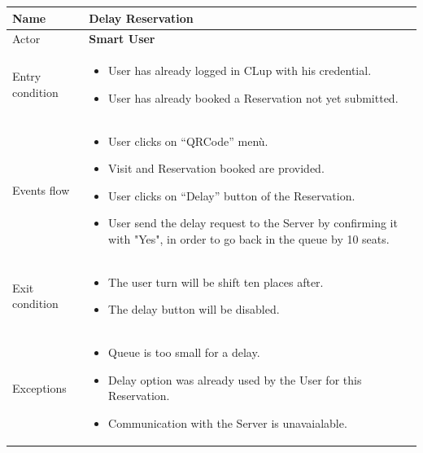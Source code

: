 \begin{tabular}{|p{5cm} | p{7cm} | }
	\hline
	Name & \textbf{Delay Reservation} \\
	\hline
	Actor & \textbf{Smart User}\\
	\hline
	Entry condition &
	\begin{itemize}
		\item User has already logged in CLup with his credential. 
		\item User has already booked a Reservation not yet submitted.
	\end{itemize} \\
	\hline
	Events flow & 
	\begin{itemize}
		\item User clicks on “QRCode” menù.
		\item Visit and Reservation booked are provided.
		\item User clicks on “Delay” button of the Reservation.
		\item User send the delay request to the Server by confirming it with "Yes", in order to go back in the queue by 10 seats.
	\end{itemize} \\
	\hline
	Exit condition &
	\begin{itemize}
		\item The user turn will be shift ten places after.
		\item The delay button will be disabled.
	\end{itemize} \\
	\hline 
	Exceptions & 
	\begin{itemize}
		\item Queue is too small for a delay.
		\item Delay option was already used by the User for this Reservation.
    	\item Communication with the Server is unavaialable.
	\end{itemize} \\
	\hline
\end{tabular}

\par \medskip

